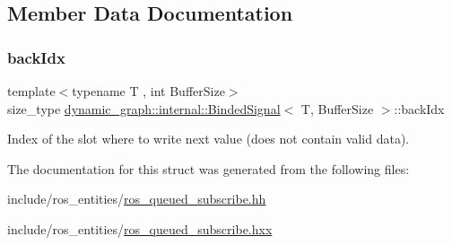 \subsection{Member Data Documentation}
\mbox{\label{structdynamic__graph_1_1internal_1_1BindedSignal_a93b1cf4373c6271937f535a68334c523}} 
\subsubsection{\texorpdfstring{back\+Idx}{backIdx}}
{\footnotesize\ttfamily template$<$typename T , int Buffer\+Size$>$ \\
size\+\_\+type \hyperlink{structdynamic__graph_1_1internal_1_1BindedSignal}{dynamic\+\_\+graph\+::internal\+::\+Binded\+Signal}$<$ T, Buffer\+Size $>$\+::back\+Idx}



Index of the slot where to write next value (does not contain valid data). 



The documentation for this struct was generated from the following files\+:\begin{DoxyCompactItemize}
\item 
include/ros\+\_\+entities/\hyperlink{ros__queued__subscribe_8hh}{ros\+\_\+queued\+\_\+subscribe.\+hh}\item 
include/ros\+\_\+entities/\hyperlink{ros__queued__subscribe_8hxx}{ros\+\_\+queued\+\_\+subscribe.\+hxx}\end{DoxyCompactItemize}
